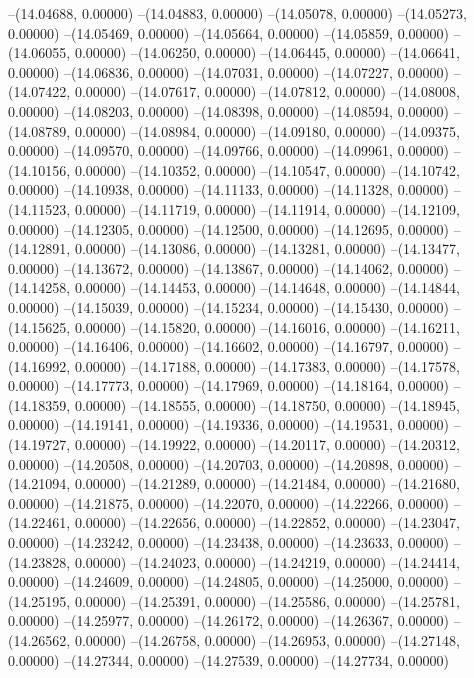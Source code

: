 --(14.04688, 0.00000)
--(14.04883, 0.00000)
--(14.05078, 0.00000)
--(14.05273, 0.00000)
--(14.05469, 0.00000)
--(14.05664, 0.00000)
--(14.05859, 0.00000)
--(14.06055, 0.00000)
--(14.06250, 0.00000)
--(14.06445, 0.00000)
--(14.06641, 0.00000)
--(14.06836, 0.00000)
--(14.07031, 0.00000)
--(14.07227, 0.00000)
--(14.07422, 0.00000)
--(14.07617, 0.00000)
--(14.07812, 0.00000)
--(14.08008, 0.00000)
--(14.08203, 0.00000)
--(14.08398, 0.00000)
--(14.08594, 0.00000)
--(14.08789, 0.00000)
--(14.08984, 0.00000)
--(14.09180, 0.00000)
--(14.09375, 0.00000)
--(14.09570, 0.00000)
--(14.09766, 0.00000)
--(14.09961, 0.00000)
--(14.10156, 0.00000)
--(14.10352, 0.00000)
--(14.10547, 0.00000)
--(14.10742, 0.00000)
--(14.10938, 0.00000)
--(14.11133, 0.00000)
--(14.11328, 0.00000)
--(14.11523, 0.00000)
--(14.11719, 0.00000)
--(14.11914, 0.00000)
--(14.12109, 0.00000)
--(14.12305, 0.00000)
--(14.12500, 0.00000)
--(14.12695, 0.00000)
--(14.12891, 0.00000)
--(14.13086, 0.00000)
--(14.13281, 0.00000)
--(14.13477, 0.00000)
--(14.13672, 0.00000)
--(14.13867, 0.00000)
--(14.14062, 0.00000)
--(14.14258, 0.00000)
--(14.14453, 0.00000)
--(14.14648, 0.00000)
--(14.14844, 0.00000)
--(14.15039, 0.00000)
--(14.15234, 0.00000)
--(14.15430, 0.00000)
--(14.15625, 0.00000)
--(14.15820, 0.00000)
--(14.16016, 0.00000)
--(14.16211, 0.00000)
--(14.16406, 0.00000)
--(14.16602, 0.00000)
--(14.16797, 0.00000)
--(14.16992, 0.00000)
--(14.17188, 0.00000)
--(14.17383, 0.00000)
--(14.17578, 0.00000)
--(14.17773, 0.00000)
--(14.17969, 0.00000)
--(14.18164, 0.00000)
--(14.18359, 0.00000)
--(14.18555, 0.00000)
--(14.18750, 0.00000)
--(14.18945, 0.00000)
--(14.19141, 0.00000)
--(14.19336, 0.00000)
--(14.19531, 0.00000)
--(14.19727, 0.00000)
--(14.19922, 0.00000)
--(14.20117, 0.00000)
--(14.20312, 0.00000)
--(14.20508, 0.00000)
--(14.20703, 0.00000)
--(14.20898, 0.00000)
--(14.21094, 0.00000)
--(14.21289, 0.00000)
--(14.21484, 0.00000)
--(14.21680, 0.00000)
--(14.21875, 0.00000)
--(14.22070, 0.00000)
--(14.22266, 0.00000)
--(14.22461, 0.00000)
--(14.22656, 0.00000)
--(14.22852, 0.00000)
--(14.23047, 0.00000)
--(14.23242, 0.00000)
--(14.23438, 0.00000)
--(14.23633, 0.00000)
--(14.23828, 0.00000)
--(14.24023, 0.00000)
--(14.24219, 0.00000)
--(14.24414, 0.00000)
--(14.24609, 0.00000)
--(14.24805, 0.00000)
--(14.25000, 0.00000)
--(14.25195, 0.00000)
--(14.25391, 0.00000)
--(14.25586, 0.00000)
--(14.25781, 0.00000)
--(14.25977, 0.00000)
--(14.26172, 0.00000)
--(14.26367, 0.00000)
--(14.26562, 0.00000)
--(14.26758, 0.00000)
--(14.26953, 0.00000)
--(14.27148, 0.00000)
--(14.27344, 0.00000)
--(14.27539, 0.00000)
--(14.27734, 0.00000)
